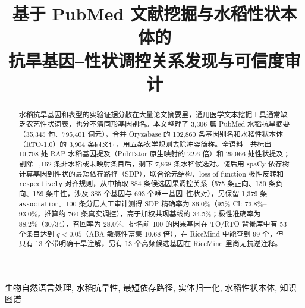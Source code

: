 \documentclass[conference]{IEEEtran}
\begin{document}
\title{基于 PubMed 文献挖掘与水稻性状本体的\\抗旱基因--性状调控关系发现与可信度审计}

\author{
}

\maketitle

\begin{abstract}
水稻抗旱基因和表型的实验证据分散在大量论文摘要里，通用医学文本挖掘工具通常缺乏农艺性状词表，也分不清同形基因别名。本文整理了 3,306 篇 PubMed 水稻抗旱摘要（35,345 句、795,401 词元），合并 Oryzabase 的 102,860 条基因别名和水稻性状本体（RTO-1.0）的 3,904 条同义词，用五条农学规则去除冲突简称。全语料一共标出 10,708 处 RAP 水稻基因提及（PubTator 原生映射的 22.6 倍）和 29,966 处性状提及；剔除 1,162 条非水稻或未映射条目后，剩下 7,868 条水稻候选对。随后用 spaCy 依存树计算基因到性状的最短依存路径（SDP），联合论元结构、loss-of-function 极性反转和 \texttt{respectively} 对齐规则，从中抽取 884 条候选因果调控关系（575 条正向、150 条负向、159 条中性，涉及 385 个基因与 693 个唯一基因--性状对），另保留 1,379 条 \texttt{association}。100 条分层人工审计测得 SDP 精确率为 86.0\%（95\% CI: 73.8\%--93.0\%，推算约 760 条真实调控），高于加权共现基线的 34.5\%；极性准确率为 88.2\%（30/34），召回率为 28.0\%。排名前 100 的因果基因在 TO/RTO 背景库中有 53 个条目达到 $q<0.05$（ABA 敏感性富集 10.68 倍），在 RiceMind 中能查到 99 个，但只有 13 个带明确干旱注解，另有 13 个高频候选基因在 RiceMind 里尚无抗逆注释。
\end{abstract}

\begin{IEEEkeywords}
生物自然语言处理, 水稻抗旱性, 最短依存路径, 实体归一化, 水稻性状本体, 知识图谱
\end{IEEEkeywords}

\end{document}
